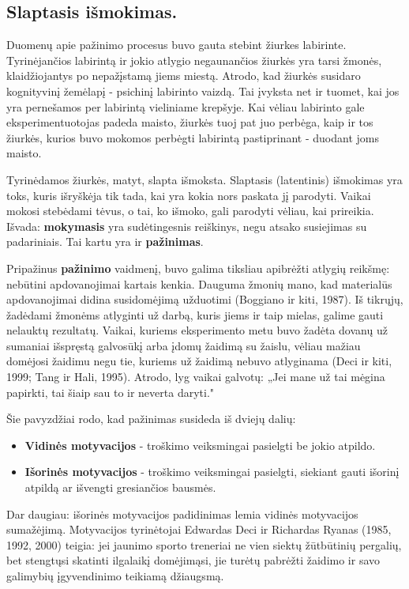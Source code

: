\documentclass{article}
\begin{document}
\subsection{Slaptasis išmokimas.}

Duomenų apie pažinimo procesus buvo gauta stebint žiurkes labirinte. Tyrinėjančios labirintą ir jokio atlygio negaunančios
žiurkės yra tarsi žmonės, klaidžiojantys po nepažįstamą jiems miestą. Atrodo, kad žiurkės susidaro kognityvinį žemėlapį - psichinį labirinto vaizdą. Tai įvyksta net ir tuomet, kai jos yra pernešamos per labirintą vieliniame krepšyje. Kai vėliau
labirinto gale eksperimentuotojas padeda maisto, žiurkės tuoj pat juo perbėga, kaip ir tos žiurkės, kurios buvo mokomos perbėgti labirintą pastiprinant - duodant joms maisto.

Tyrinėdamos žiurkės, matyt, slapta išmoksta. Slaptasis (latentinis) išmokimas
yra toks, kuris išryškėja tik tada, kai yra kokia nors paskata jį parodyti.
Vaikai mokosi stebėdami tėvus, o tai, ko išmoko, gali parodyti vėliau, kai prireikia.
Išvada: \textbf{mokymasis} yra sudėtingesnis reiškinys, negu atsako susiejimas
su padariniais. Tai kartu yra ir \textbf{pažinimas}.

Pripažinus \textbf{pažinimo} vaidmenį, buvo galima tiksliau apibrėžti atlygių reikšmę: nebūtini apdovanojimai kartais kenkia. Dauguma žmonių mano, kad materialūs apdovanojimai didina susidomėjimą užduotimi (Boggiano ir kiti, 1987). Iš tikrųjų, žadėdami žmonėms atlyginti už darbą, kuris jiems ir taip mielas, galime gauti nelauktų rezultatų. Vaikai, kuriems eksperimento metu buvo žadėta dovanų už sumaniai išspręstą galvosūkį arba įdomų žaidimą su žaislu, vėliau mažiau domėjosi žaidimu negu tie, kuriems už žaidimą nebuvo atlyginama (Deci ir kiti, 1999; Tang ir Hali, 1995). Atrodo, lyg vaikai galvotų: „Jei mane už tai mėgina papirkti, tai šiaip sau to ir neverta daryti." 

Šie pavyzdžiai rodo, kad pažinimas susideda iš dviejų dalių:
\begin{itemize}
\item \textbf{Vidinės motyvacijos} -  troškimo veiksmingai pasielgti be jokio atpildo.
\item \textbf{Išorinės motyvacijos} - troškimo veiksmingai pasielgti, siekiant gauti išorinį atpildą ar išvengti gresiančios
bausmės. 
\end{itemize}

Dar daugiau: išorinės motyvacijos padidinimas lemia vidinės motyvacijos sumažėjimą. Motyvacijos tyrinėtojai Edwardas Deci ir Richardas Ryanas (1985, 1992, 2000) teigia: jei jaunimo sporto treneriai ne vien siektų žūtbūtinių pergalių, bet stengtųsi skatinti ilgalaikį domėjimąsi, jie turėtų pabrėžti žaidimo ir savo galimybių įgyvendinimo teikiamą džiaugsmą.
\end{document}
